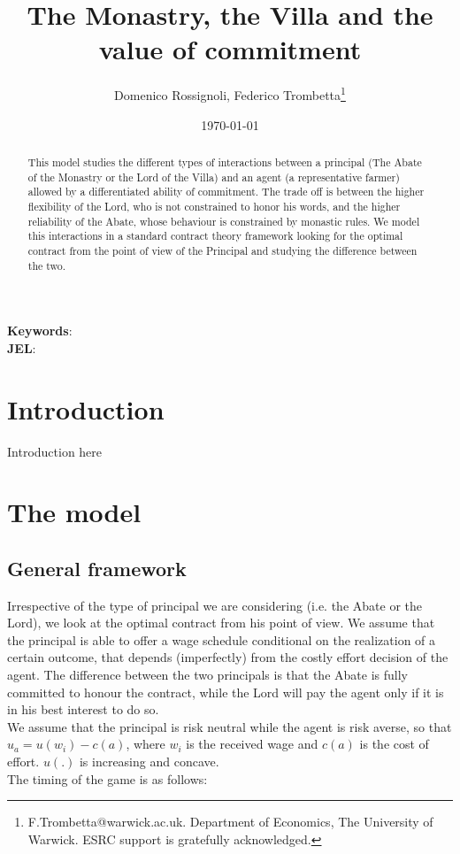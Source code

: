 \documentclass[12pt,a4paper]{article}
\begin{document}
\title{\textbf{The Monastry, the Villa and the value of commitment}}
\author{Domenico Rossignoli, Federico Trombetta\thanks{F.Trombetta@warwick.ac.uk. Department of Economics, The University of Warwick. ESRC support is gratefully acknowledged.}
				}


\date{\today}


\maketitle

\renewcommand{\baselinestretch}{1.5}\small\normalsize

\begin{abstract}
This model studies the different types of interactions between a principal (The Abate of the Monastry or the Lord of the Villa) and an agent (a representative farmer) allowed by a differentiated ability of commitment. The trade off is between the higher flexibility of the Lord, who is not constrained to honor his words, and the higher reliability of the Abate, whose behaviour is constrained by monastic rules. We model this interactions in a standard contract theory framework looking for the optimal contract from the point of view of the Principal and studying the difference between the two.
\end{abstract}

\textbf{Keywords}: \\
\textbf{JEL}:

\renewcommand{\baselinestretch}{1.5}\small\normalsize


\section{Introduction}\label{introduction}

Introduction here

\section{The model}

\subsection{General framework}
Irrespective of the type of principal we are considering (i.e. the Abate or the Lord), we look at the optimal contract from his point of view. We assume that the principal is able to offer a wage schedule conditional on the realization of a certain outcome, that depends (imperfectly) from the costly effort decision of the agent. The difference between the two principals is that the Abate is fully committed to honour the contract, while the Lord will pay the agent only if it is in his best interest to do so.\\
We assume that the principal is risk neutral while the agent is risk averse, so that $u_{a}=u(w_{i})-c(a)$, where $w_{i}$ is the received wage and $c(a)$ is the cost of effort. $u(.)$ is increasing and concave.\\
The timing of the game is as follows:
\end{document}
